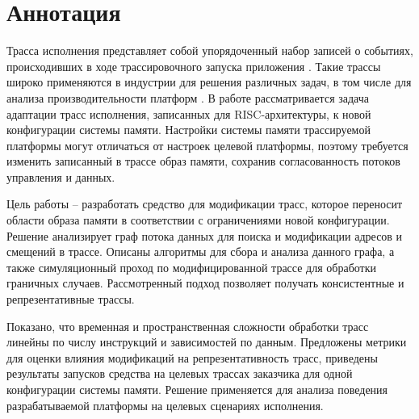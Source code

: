 \section*{Аннотация}

Трасса исполнения представляет собой упорядоченный набор записей о событиях, происходивших в ходе трассировочного запуска приложения \cite{pinplay,whole_execution_traces}. Такие трассы широко применяются в индустрии для решения различных задач, в том числе для анализа производительности платформ \cite{pinplay,autofdo,lisitsyn_disser}. В работе рассматривается задача адаптации трасс исполнения, записанных для RISC-архитектуры, к новой конфигурации системы памяти. Настройки системы памяти трассируемой платформы могут отличаться от настроек целевой платформы, поэтому требуется изменить записанный в трассе образ памяти, сохранив согласованность потоков управления и данных.

Цель работы -- разработать средство для модификации трасс, которое переносит области образа памяти в соответствии с ограничениями новой конфигурации. Решение анализирует граф потока данных для поиска и модификации адресов и смещений в трассе. Описаны алгоритмы для сбора и анализа данного графа, а также симуляционный проход по модифицированной трассе для обработки граничных случаев. Рассмотренный подход позволяет получать консистентные и репрезентативные трассы.

Показано, что временная и пространственная сложности обработки трасс линейны по числу инструкций и зависимостей по данным. Предложены метрики для оценки влияния модификаций на репрезентативность трасс, приведены результаты запусков средства на целевых трассах заказчика для одной конфигурации системы памяти. Решение применяется для анализа поведения разрабатываемой платформы на целевых сценариях исполнения.

\newpage


